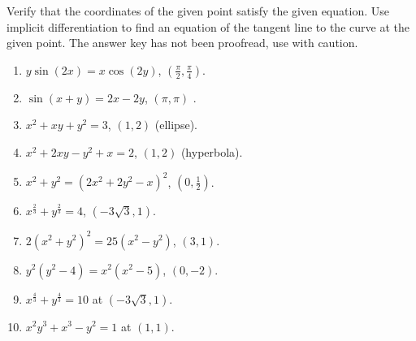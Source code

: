 Verify that the coordinates of the given point satisfy the given equation. Use implicit differentiation to find an equation of the tangent line to the curve at the given point. 
The answer key has not been proofread, use with caution.
\begin{multicols}{3}
\begin{enumerate}[ref={\fcProblemRef}]
\item \label{problemImplicitTangentysin(2x)=xcos(2y)point(pi/2,pi/4)} $y\sin (2x)=x\cos (2y) $, $\left(\frac{\pi}{2}, \frac{\pi}{4}\right)$. 

\item $ \sin (x+y)=2x-2y$, $(\pi,\pi)$ . 

\item $x^2+x y+y^2=3 $, $(1,2)$ (ellipse). 

\item $x^2+2x y-y^2+x=2 $, $(1,2)$ (hyperbola). 

\item $x^2+y^2=(2x^2+2y^2-x)^2 $, $(0,\frac{1}{2})$. 

\item $x^{\frac{2}{3}}+y^{\frac{2}{3}}=4$, $(-3\sqrt{3},1)$. 

\item $2(x^2+y^2)^2 =25(x^2-y^2)$, $(3,1)$. 

\item $y^2(y^2-4)=x^2(x^2-5) $, $(0,-2)$. 

\item $x^{\frac{4}{3}}+y^{\frac{4}{3}}=10$ at $(-3\sqrt{3}, 1)$. 

\item $x^2y^3+x^3-y^2=1$ at $(1,1)$. 

\end{enumerate}
\end{multicols}
